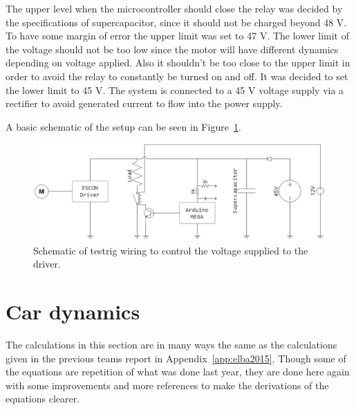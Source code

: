 The upper level when the microcontroller should close the relay was decided by the specifications of supercapacitor, since it should not be charged beyond 48 V. To have some margin of error the upper limit was set to 47 V. The lower limit of the voltage should not be too low since the motor will have different dynamics depending on voltage applied. Also it shouldn't be too close to the upper limit in order to avoid the relay to constantly be turned on and off. It was decided to set the lower limit to 45 V. The system is connected to a 45 V voltage supply via a rectifier to avoid generated current to flow into the power supply.

A basic schematic of the setup can be seen in
Figure~\ref{fig:testrig_schematic}.

\begin{figure}[H]
    \centering
    \includegraphics[width=\textwidth]{./img/testrig_schematic.png}
    \caption{Schematic of testrig wiring to control the voltage supplied to the driver.}\label{fig:testrig_schematic}
\end{figure}

\section{Car dynamics}\label{sec:cardynamics}
The calculations in this section are in many ways the same as the calculations
given in the previous teams report in Appendix~\ref{app:elba2015}. Though some
of the equations are repetition of what was done last year, they are
done here again with some improvements and more references to make the
derivations of the equations clearer.


